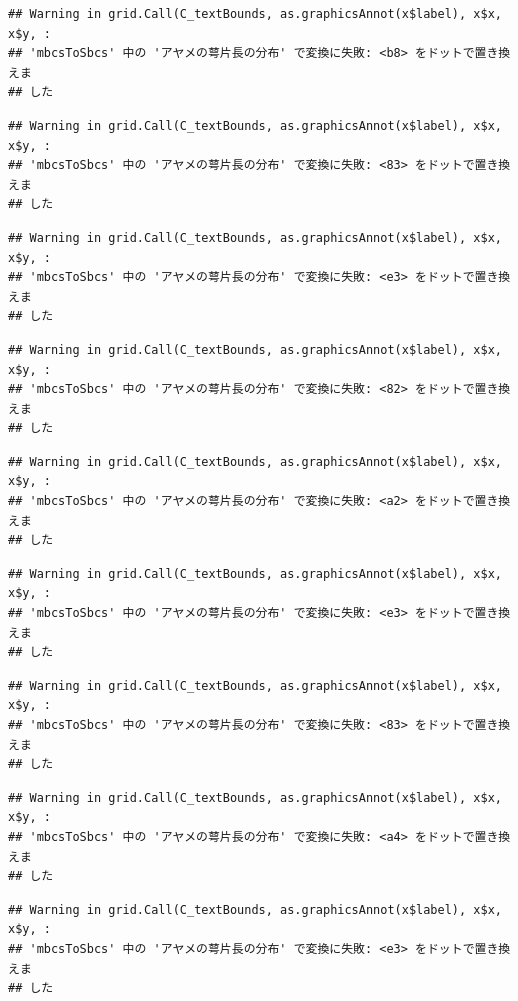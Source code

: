 \documentclass[
]{book}
\begin{document}
\begin{verbatim}
## Warning in grid.Call(C_textBounds, as.graphicsAnnot(x$label), x$x, x$y, :
## 'mbcsToSbcs' 中の 'アヤメの萼片長の分布' で変換に失敗: <b8> をドットで置き換えま
## した
\end{verbatim}

\begin{verbatim}
## Warning in grid.Call(C_textBounds, as.graphicsAnnot(x$label), x$x, x$y, :
## 'mbcsToSbcs' 中の 'アヤメの萼片長の分布' で変換に失敗: <83> をドットで置き換えま
## した
\end{verbatim}

\begin{verbatim}
## Warning in grid.Call(C_textBounds, as.graphicsAnnot(x$label), x$x, x$y, :
## 'mbcsToSbcs' 中の 'アヤメの萼片長の分布' で変換に失敗: <e3> をドットで置き換えま
## した
\end{verbatim}

\begin{verbatim}
## Warning in grid.Call(C_textBounds, as.graphicsAnnot(x$label), x$x, x$y, :
## 'mbcsToSbcs' 中の 'アヤメの萼片長の分布' で変換に失敗: <82> をドットで置き換えま
## した
\end{verbatim}

\begin{verbatim}
## Warning in grid.Call(C_textBounds, as.graphicsAnnot(x$label), x$x, x$y, :
## 'mbcsToSbcs' 中の 'アヤメの萼片長の分布' で変換に失敗: <a2> をドットで置き換えま
## した
\end{verbatim}

\begin{verbatim}
## Warning in grid.Call(C_textBounds, as.graphicsAnnot(x$label), x$x, x$y, :
## 'mbcsToSbcs' 中の 'アヤメの萼片長の分布' で変換に失敗: <e3> をドットで置き換えま
## した
\end{verbatim}

\begin{verbatim}
## Warning in grid.Call(C_textBounds, as.graphicsAnnot(x$label), x$x, x$y, :
## 'mbcsToSbcs' 中の 'アヤメの萼片長の分布' で変換に失敗: <83> をドットで置き換えま
## した
\end{verbatim}

\begin{verbatim}
## Warning in grid.Call(C_textBounds, as.graphicsAnnot(x$label), x$x, x$y, :
## 'mbcsToSbcs' 中の 'アヤメの萼片長の分布' で変換に失敗: <a4> をドットで置き換えま
## した
\end{verbatim}

\begin{verbatim}
## Warning in grid.Call(C_textBounds, as.graphicsAnnot(x$label), x$x, x$y, :
## 'mbcsToSbcs' 中の 'アヤメの萼片長の分布' で変換に失敗: <e3> をドットで置き換えま
## した
\end{verbatim}
\end{document}

